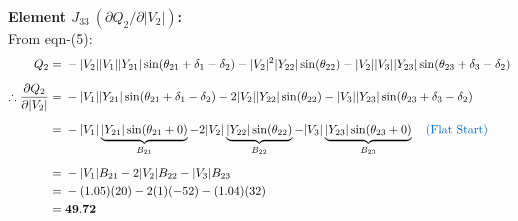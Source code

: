\documentclass[11pt]{article}
\begin{document}
\begin{stepbox}
\newpage
\vspace{0.3cm}
\noindent \textbf{Element $J_{33} \ (\partial Q_2 / \partial |V_2|)$:} \\
From eqn-(5):
\begin{align*}
    Q_2 =\;& -|V_2||V_1||Y_{21}| \sin(\theta_{21} + \delta_1 - \delta_2) - |V_2|^2|Y_{22}| \sin(\theta_{22}) - |V_2||V_3||Y_{23}| \sin(\theta_{23} + \delta_3 - \delta_2) \\[0.2cm]
    \therefore \frac{\partial Q_2}{\partial |V_2|} =\;& -|V_1||Y_{21}| \sin(\theta_{21} + \delta_1 - \delta_2) - 2|V_2||Y_{22}| \sin(\theta_{22}) - |V_3||Y_{23}| \sin(\theta_{23} + \delta_3 - \delta_2) \\[0.2cm]
    =\;& -|V_1|\underbrace{|Y_{21}|\sin(\theta_{21} + 0)}_{B_{21}} - 2|V_2|\underbrace{|Y_{22}|\sin(\theta_{22})}_{B_{22}} - |V_3|\underbrace{|Y_{23}|\sin(\theta_{23} + 0)}_{B_{23}} \quad \text{\textcolor{mainblue}{(Flat Start)}} \\[0.2cm]
    =\;& -|V_1|B_{21} - 2|V_2|B_{22} - |V_3|B_{23} \\
    =\;& -(1.05)(20) - 2(1)(-52) - (1.04)(32) \\
    =\;& \mathbf{49.72}
\end{align*}
\end{stepbox}
\end{document}
